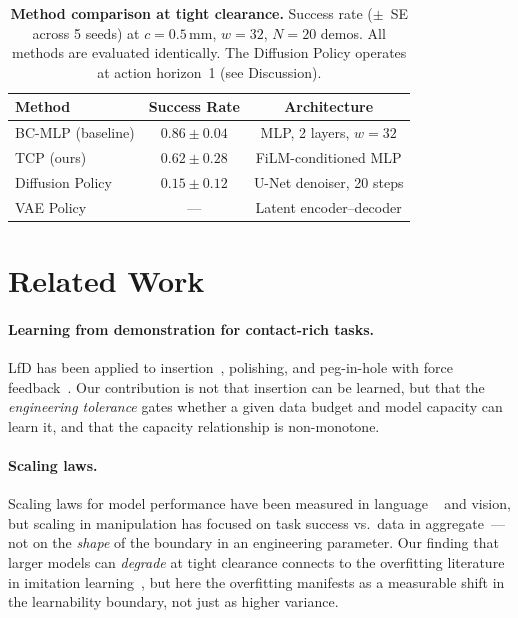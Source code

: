 \documentclass[11pt]{article}
\begin{document}
\begin{table}[t]
\centering
\caption{\textbf{Method comparison at tight clearance.} Success rate
($\pm$~SE across 5 seeds) at $c = 0.5$\,mm, $w = 32$, $N = 20$ demos.
All methods are evaluated identically. The Diffusion Policy operates at
action horizon~1 (see Discussion).}
\label{tab:methods}
\smallskip
\begin{tabular}{lcc}
\toprule
Method & Success Rate & Architecture \\
\midrule
BC-MLP (baseline) & $0.86 \pm 0.04$ & MLP, 2 layers, $w = 32$ \\
TCP (ours) & $0.62 \pm 0.28$ & FiLM-conditioned MLP \\
Diffusion Policy & $0.15 \pm 0.12$ & U-Net denoiser, 20 steps \\
VAE Policy & --- & Latent encoder--decoder \\
\bottomrule
\end{tabular}
\end{table}

\section{Related Work}

\paragraph{Learning from demonstration for contact-rich tasks.}
LfD has been applied to insertion~\citep{luo2021rotate,inoue2017deep},
polishing, and peg-in-hole with force feedback~\citep{chen2022dextreme}.
Our contribution is not that insertion can be learned, but that the
\emph{engineering tolerance} gates whether a given data budget and model
capacity can learn it, and that the capacity relationship is non-monotone.

\paragraph{Scaling laws.}
Scaling laws for model performance have been measured in language
~\citep{kaplan2020scaling} and vision, but scaling in manipulation has
focused on task success vs.\ data in aggregate~\citep{brohan2023rt}---not on
the \emph{shape} of the boundary in an engineering parameter. Our finding
that larger models can \emph{degrade} at tight clearance connects to the
overfitting literature in imitation learning~\citep{laskey2017dart}, but here
the overfitting manifests as a measurable shift in the learnability boundary,
not just as higher variance.
\end{document}
